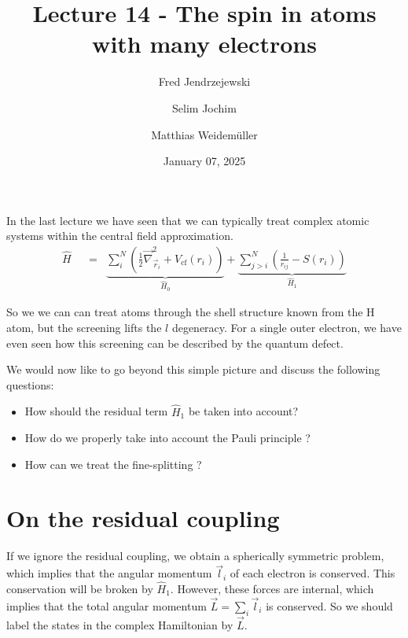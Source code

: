 \documentclass[10pt]{article}
\let\cite\citep
\providecommand\citep{\cite}
\newcommand*\ch[1]{\ensuremath{\mathrm{#1}}}
\begin{document}
\title{Lecture 14 - The spin in atoms with many electrons}



\author[1]{Fred Jendrzejewski}%
\author[2]{Selim Jochim}%
\author[2]{Matthias Weidemüller}%
%
%


\vspace{-1em}



  
  \date{January 07, 2025}


\begingroup
\let\center\flushleft
\let\endcenter\endflushleft
\maketitle
\endgroup








\sloppy


In the last lecture \cite{electrons} we have seen that we can typically treat complex atomic systems within the central field approximation. 
\begin{align} \label{eq:lsvsjjhamiltonian}
\hat{H} &&=& \underbrace{\sum_i^N \left( \frac{1}{2} \vec{\nabla}^2_{\vec{r}_i} + V_\textrm{cf} (r_i) \right)}_{\hat{H}_0} + \underbrace{\sum^N_{j>i} \left( \frac{1}{r_{ij}} - S(r_i) \right)}_{\hat{H}_1}
\end{align}

So we we can can treat atoms through the shell structure known from the \ch{H} atom, but the screening lifts the $l$ degeneracy. For a single outer electron, we have even seen how this screening can be described by the quantum defect.

We would now like to go beyond this simple picture and discuss the following questions:
\begin{itemize}
\item How should the residual term $\hat{H}_1$ be taken into account?
\item How do we properly take into account the Pauli principle ?
\item How can we treat the fine-splitting ?
\end{itemize}

\section{On the residual coupling}
If we ignore the residual coupling, we obtain a spherically symmetric problem, which implies that the angular momentum $\vec{l}_i$ of each electron is conserved. This conservation will be broken by $\hat{H}_{1}$. However, these forces are internal, which implies that the total angular momentum $\vec{L} = \sum_i \vec{l}_i$ is conserved. So we should label the states in the complex Hamiltonian by $\vec{L}$.
\end{document}

